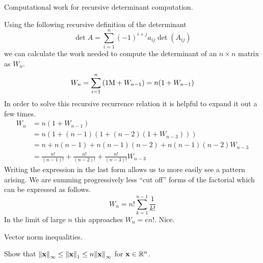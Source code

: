 \documentclass[boxes]{homework}
\begin{document}
\clearpage

\begin{problem}
Computational work for recursive determinant computation.
\end{problem}

\begin{solution}
	Using the following recursive definition of the determinant
	\begin{equation*}
		\det A = \sum_{i = 1}^n (-1)^{i + j}a_{ij}\det(A_{ij})
	\end{equation*}
	we can calculate the work needed to compute the determinant of an $n\times n$ matrix as $W_n$.
	\begin{equation*}
		W_n = \sum_{i = 1}^n\qty(1\mathrm{M} + W_{n - 1}) = n\qty(1 + W_{n - 1})
	\end{equation*}
	In order to solve this recursive recurrence relation it is helpful to expand it out a few times.
	\begin{align*}
		W_n & = n(1 + W_{n - 1})                                                         \\
		    & = n(1 + (n - 1)(1 + (n - 2)(1 + W_{n - 3})))                               \\
		    & = n + n(n - 1) + n(n - 1)(n - 2) + n(n-1)(n - 2)W_{n - 3}                  \\
		    & = \frac{n!}{(n - 1)!} + \frac{n!}{(n - 2)!} + \frac{n!}{(n - 3)!}W_{n - 3}
	\end{align*}
	Writing the expression in the last form allows us to more easily see a pattern arising. We are summing progressively less ``cut off'' forms of the factorial which can be expressed as follows.
	\begin{equation*}
		W_n = n!\sum_{k = 1}^{n - 1}\frac{1}{k!}
	\end{equation*}
	In the limit of large $n$ this approaches $W_n = en!$. Nice.
\end{solution}

\clearpage

\begin{problem}
Vector norm inequalities.

Show that $\norm{\vb{x}}_\infty \leq\norm{\vb{x}}_1 \leq n\norm{\vb{x}}_\infty$ for $\vb{x}\in\mathbb{R}^n$.
\end{problem}
\end{document}
